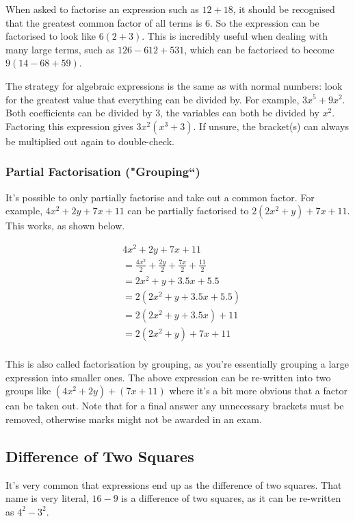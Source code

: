 When asked to factorise an expression such as $12 + 18$, it should be recognised that the greatest common factor of all terms is $6$. So the expression can be factorised to look like $6(2 + 3)$. This is incredibly useful when dealing with many large terms, such as $126 - 612 + 531$, which can be factorised to become $9(14 - 68 + 59)$.

The strategy for algebraic expressions is the same as with normal numbers: look for the greatest value that everything can be divided by. For example, $3x^5 + 9x^2$. Both coefficients can be divided by 3, the variables can both be divided by $x^2$. Factoring this expression gives $3x^2(x^3+3)$. If unsure, the bracket(s) can always be multiplied out again to double-check.

\subsubsection{Partial Factorisation ("Grouping``)}
It's possible to only partially factorise and take out a common factor. For example, $4x^2+2y+7x+11$ can be partially factorised to $2(2x^2+y)+7x+11$. This works, as shown below.

\begin{align*}
	&4x^2+2y+7x+11\\
	&=\frac{4x^2}{2}+\frac{2y}{2}+\frac{7x}{2}+\frac{11}{2}\\
	&=2x^2+y+3.5x+5.5\\
	&=2(2x^2+y+3.5x+5.5)\\
	&=2(2x^2+y+3.5x)+11\\
	&=2(2x^2+y)+7x+11\\
\end{align*}

This is also called factorisation by grouping, as you're essentially grouping a large expression into smaller ones. The above expression can be re-written into two groups like $(4x^2+2y)+(7x+11)$ where it's a bit more obvious that a factor can be taken out. Note that for a final answer any unnecessary brackets must be removed, otherwise marks might not be awarded in an exam.

\subsection{Difference of Two Squares}
It's very common that expressions end up as the difference of two squares. That name is very literal, $16 - 9$ is a difference of two squares, as it can be re-written as $4^2 - 3^2$.

